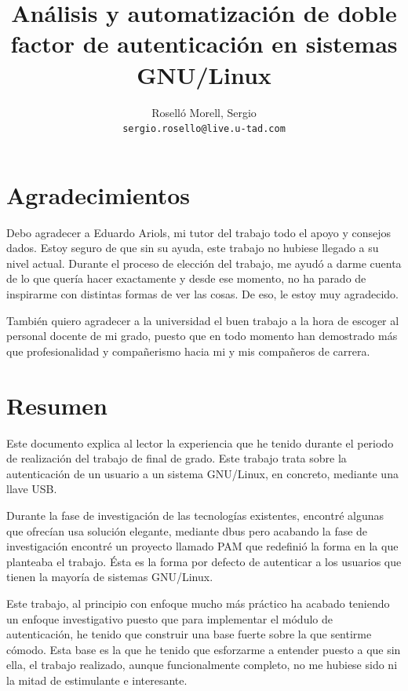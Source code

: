 \documentclass[titlepage, 12pt, a4paper]{article}
\title{\color{white}Análisis y automatización de doble factor de autenticación en sistemas GNU/Linux}
\author{\color{white}Roselló Morell, Sergio\\
\texttt{\color{white}sergio.rosello@live.u-tad.com}}
\begin{document}
\afterpage{\restorepagecolor}
\maketitle
\section*{Agradecimientos}
Debo agradecer a Eduardo Ariols, mi tutor del trabajo todo el apoyo y consejos dados. Estoy seguro de que sin su ayuda, este trabajo no hubiese llegado a su nivel actual. Durante el proceso de elección del trabajo, me ayudó a darme cuenta de lo que quería hacer exactamente y desde ese momento, no ha parado de inspirarme con distintas formas de ver las cosas. De eso, le estoy muy agradecido.\par También quiero agradecer a la universidad el buen trabajo a la hora de escoger al personal docente de mi grado, puesto que en todo momento han demostrado más que profesionalidad y compañerismo hacia mi y mis compañeros de carrera.
\clearpage
\section*{Resumen}
Este documento explica al lector la experiencia que he tenido durante el periodo de realización del trabajo de final de grado. Este trabajo trata sobre la autenticación de un usuario a un sistema \Gls{GNU/Linux}, en concreto, mediante una llave \Gls{USB}.\par Durante la fase de investigación de las tecnologías existentes, encontré algunas que ofrecían usa solución elegante, mediante \Gls{dbus} pero acabando la fase de investigación encontré un proyecto llamado \Gls{PAM} que redefinió la forma en la que planteaba el trabajo. Ésta es la forma por defecto de autenticar a los usuarios que tienen la mayoría de sistemas \Gls{GNU/Linux}.\par Este trabajo, al principio con enfoque mucho más práctico ha acabado teniendo un enfoque investigativo puesto que para implementar el módulo de autenticación, he tenido que construir una base fuerte sobre la que sentirme cómodo. Esta base es la que he tenido que esforzarme a entender puesto a que sin ella, el trabajo realizado, aunque funcionalmente completo, no me hubiese sido ni la mitad de estimulante e interesante.
\clearpage
\end{document}
